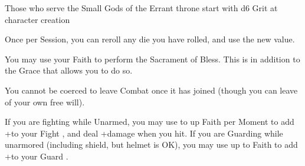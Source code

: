 {\newpage






Those who serve the Small Gods of the Errant throne start with d6 Grit at character creation





\GOD[
Name=Balo,
Link=small-god-balo,
GodOf=Archon of Games and Contests,
Holy=a leather bag of bone dice hung from the neck or belt
]


Once per Session, you can reroll any die you have rolled, and use the new value.


You may use your Faith to perform the Sacrament of Bless.  This is in addition to the Grace that allows you to do so.




\GOD[
Name=Gilgamesh,
Link=small-god-gilgamesh,
GodOf=Lord of Strength and Valor,
Holy=a pair of bull's horns hung from the neck or worn as a helmet
]


You cannot be coerced to leave Combat once it has joined (though you can leave of your own free will).


If you are fighting while Unarmed, you may use to up \LVL Faith per Moment to add +\SUMDICE to your Fight \RO, and deal +\DICE damage when you hit.  If you are Guarding while unarmored (including shield, but helmet is OK), you may use up to \LVL Faith to add +\SUMDICE to your Guard \RO.





\GOD[
Name=Issek of the Jug,
Link=small-god-issek of the jug,
GodOf=Seraph of Suffering and Freedom,
Holy=a broken pair of manacles
]

}
